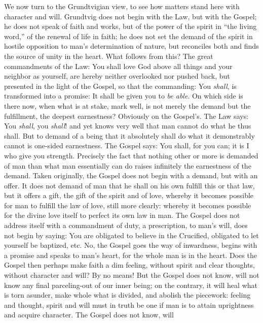 \documentclass[12pt,a4paper,openany]{book}
\newcommand{\opage}[1]{\marginnote{\footnotesize\textit{[#1]}}}
\begin{document}
We now turn to the Grundtvigian view, to
see how matters stand here with character and
will. Grundtvig does not begin with the Law, but with
the Gospel; he does not speak of faith and works, but
of the power of the spirit in ``the living word,'' of the renewal of life
in faith; he does not set the demand of the spirit in hostile
opposition to man's determination of nature, but reconciles
both and finds the source of unity in the heart. What
follows from this? The great commandments of the Law: You shall love
God above all things and your neighbor as yourself, are
hereby neither overlooked nor pushed back, but presented
in the light of the Gospel, so that the commanding: You \emph{shall},
is transformed into a promise: It shall be given you to \emph{be able}.
On which side is there now, when what is at stake, mark well, is
not merely the demand but the fulfillment, the
deepest earnestness? Obviously on the Gospel's. The Law says:
You \emph{shall}, you \emph{shall}! and yet knows very well that man
cannot do what he thus shall. But to demand
\setcounter{footnote}{0}%
\opage{511}of a being that it absolutely shall do what it demonstrably
cannot is one-sided earnestness. The Gospel says: You shall, for you
can; it is I who give you strength. Precisely the fact that
nothing other or more is demanded of man than what
man essentially can do raises infinitely the earnestness of the
demand. Taken originally, the Gospel does not begin with
a demand, but with an offer. It does not demand of
man that he shall on his own fulfill this
or that law, but it offers a gift, the gift of the spirit
and of love, whereby it becomes possible for man
to fulfill the law of love, still more clearly:
whereby it becomes possible for the divine love
itself to perfect its own law in man. The Gospel
does not address itself with a commandment of duty, a prescription, to
man's will, does not begin by saying: You are obligated
to believe in the Crucified, obligated to
let yourself be baptized, etc. No, the Gospel goes the way of inwardness,
begins with a promise and speaks to
man's heart, for the whole man is in the heart. Does
the Gospel then perhaps make faith a dim feeling, without
spirit and clear thoughts, without character and will? By no means!
But the Gospel does not know, will not know any
final parceling-out of our inner being; on the contrary, it will
heal what is torn asunder, make whole what is divided, and abolish
the piecework: feeling and thought, spirit and will must
in truth be one if man is to attain
uprightness and acquire character. The Gospel does not know, will
\end{document}
